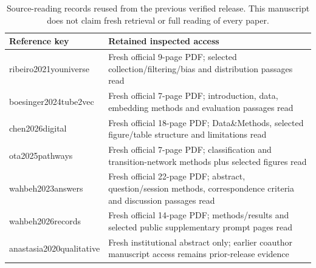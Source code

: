 \begin{table}[t]
\centering\small
\begin{tabular}{p{}p{}}
\toprule
Reference key & Retained inspected access\\
\midrule
ribeiro2021youniverse & Fresh official 9-page PDF; selected collection/filtering/bias and distribution passages read\\
boesinger2024tube2vec & Fresh official 7-page PDF; introduction, data, embedding methods and evaluation passages read\\
chen2026digital & Fresh official 18-page PDF; Data\&Methods, selected figure/table structure and limitations read\\
ota2025pathways & Fresh official 7-page PDF; classification and transition-network methods plus selected figures read\\
wahbeh2023answers & Fresh official 22-page PDF; abstract, question/session methods, correspondence criteria and discussion passages read\\
wahbeh2026records & Fresh official 14-page PDF; methods/results and selected public supplementary prompt pages read\\
anastasia2020qualitative & Fresh institutional abstract only; earlier coauthor manuscript access remains prior-release evidence\\
\bottomrule
\end{tabular}
\caption{Source-reading records reused from the previous verified release. This manuscript does not claim fresh retrieval or full reading of every paper.}
\end{table}
